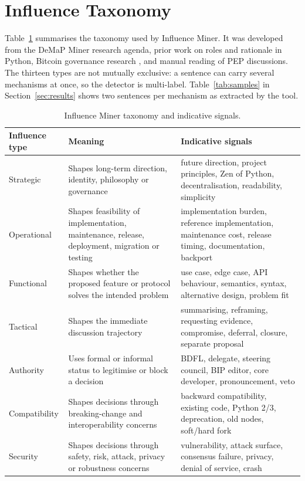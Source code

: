 \documentclass[sigconf,screen]{acmart}
\begin{document}
\section{Influence Taxonomy}

Table~\ref{tab:taxonomy} summarises the taxonomy used by Influence Miner. It was developed from the DeMaP Miner research agenda, prior work on roles and rationale in Python, Bitcoin governance research \cite{thapa2021bitcoin}, and manual reading of PEP discussions. The thirteen types are not mutually exclusive: a sentence can carry several mechanisms at once, so the detector is multi-label. Table~\ref{tab:samples} in Section~\ref{sec:results} shows two sentences per mechanism as extracted by the tool.

\begin{table}
\caption{Influence Miner taxonomy and indicative signals.}
\label{tab:taxonomy}
\begin{tabular}{p{}p{}p{}}
\toprule
\textbf{Influence type} & \textbf{Meaning} & \textbf{Indicative signals} \\
\midrule
Strategic & Shapes long-term direction, identity, philosophy or governance & future direction, project principles, Zen of Python, decentralisation, readability, simplicity \\
Operational & Shapes feasibility of implementation, maintenance, release, deployment, migration or testing & implementation burden, reference implementation, maintenance cost, release timing, documentation, backport \\
Functional & Shapes whether the proposed feature or protocol solves the intended problem & use case, edge case, API behaviour, semantics, syntax, alternative design, problem fit \\
Tactical & Shapes the immediate discussion trajectory & summarising, reframing, requesting evidence, compromise, deferral, closure, separate proposal \\
Authority & Uses formal or informal status to legitimise or block a decision & BDFL, delegate, steering council, BIP editor, core developer, pronouncement, veto \\
Compatibility & Shapes decisions through breaking-change and interoperability concerns & backward compatibility, existing code, Python 2/3, deprecation, old nodes, soft/hard fork \\
Security & Shapes decisions through safety, risk, attack, privacy or robustness concerns & vulnerability, attack surface, consensus failure, privacy, denial of service, crash \\

\end{tabular}
\end{table}
\end{document}
